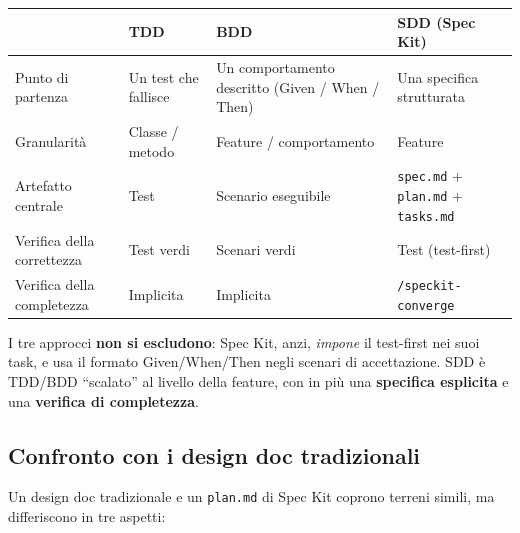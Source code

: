 \documentclass[
  italian,
  10pt,
]{book}
\newcounter{none} %
\begin{document}
{\def\LTcaptype{none} %
\begin{longtable}[]{@{}
  >{\raggedright\arraybackslash}p{}
  >{\raggedright\arraybackslash}p{}
  >{\raggedright\arraybackslash}p{}
  >{\raggedright\arraybackslash}p{}@{}}
\toprule\noalign{}
\begin{minipage}[b]{\linewidth}\raggedright
\end{minipage} & \begin{minipage}[b]{\linewidth}\raggedright
TDD
\end{minipage} & \begin{minipage}[b]{\linewidth}\raggedright
BDD
\end{minipage} & \begin{minipage}[b]{\linewidth}\raggedright
SDD (Spec Kit)
\end{minipage} \\
\midrule\noalign{}
\endhead
\bottomrule\noalign{}
\endlastfoot
Punto di partenza & Un test che fallisce & Un comportamento descritto
(Given / When / Then) & Una specifica strutturata \\
Granularità & Classe / metodo & Feature / comportamento & Feature \\
Artefatto centrale & Test & Scenario eseguibile & \texttt{spec.md} +
\texttt{plan.md} + \texttt{tasks.md} \\
Verifica della correttezza & Test verdi & Scenari verdi & Test
(test-first) \\
Verifica della completezza & Implicita & Implicita &
\texttt{/speckit-converge} \\
\end{longtable}
}

\normalsize

I tre approcci \textbf{non si escludono}: Spec Kit, anzi, \emph{impone}
il test-first nei suoi task, e usa il formato Given/When/Then negli
scenari di accettazione. SDD è TDD/BDD ``scalato'' al livello della
feature, con in più una \textbf{specifica esplicita} e una
\textbf{verifica di completezza}.

\subsection{Confronto con i design doc
tradizionali}\label{confronto-con-i-design-doc-tradizionali}

Un design doc tradizionale e un \texttt{plan.md} di Spec Kit coprono
terreni simili, ma differiscono in tre aspetti:
\end{document}
